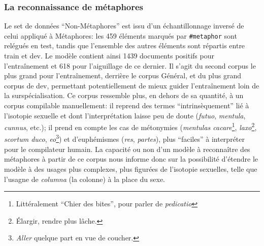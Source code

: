 
\subsubsection{La reconnaissance de métaphores}

Le set de données ``Non-Métaphores'' est issu d'un échantillonnage inversé de celui appliqué à Métaphores: les 459 éléments marqués par \texttt{\#metaphor} sont relégués en test, tandis que l'ensemble des autres éléments sont répartis entre train et dev. Le modèle contient ainsi 1439 documents positifs pour l'entraînement et 618 pour l'aiguillage de ce dernier. Il s'agit du second corpus le plus grand pour l'entraînement, derrière le corpus Général, et du plus grand corpus de dev, permettant potentiellement de mieux guider l'entraînement loin de la surspécialisation. Ce corpus ressemble plus, en dehors de sa quantité, à un corpus compilable manuellement: il reprend des termes ``intrinsèquement'' lié à l'isotopie sexuelle et dont l'interprétation laisse peu de doute (\textit{futuo}, \textit{mentula}, \textit{cunnus}, etc.); il prend en compte les cas de métonymies (\textit{mentulas cacare}\footnote{Littéralement ``Chier des bites'', pour parler de \textit{pedicatio}}, \textit{laxo}\footnote{Élargir, rendre plus lâche.}, \textit{scortum duco}, \textit{eo}\footnote{\textit{Aller} quelque part en vue de coucher.}) et d'euphémismes (\textit{res}, \textit{partes}), plus ``faciles'' à interpréter pour le compilateur humain. La capacité ou non d'un modèle à reconnaître des métaphores à partir de ce corpus nous informe donc sur la possibilité d'étendre le modèle à des usages plus complexes, plus figurées de l'isotopie sexuelles, telle que l'usagne de \textit{columna} (la colonne) à la place du sexe.


